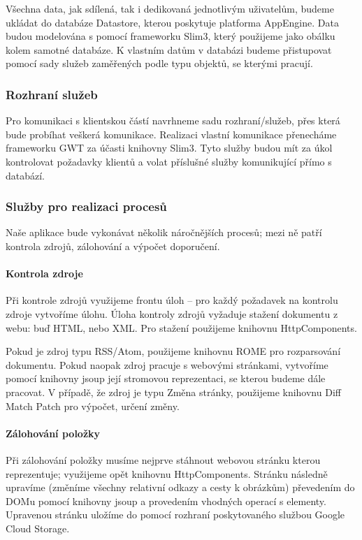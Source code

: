 Všechna data, jak sdílená, tak i dedikovaná jednotlivým uživatelům, budeme ukládat do databáze Datastore, kterou poskytuje platforma AppEngine.
Data budou modelována s pomocí frameworku Slim3, který použijeme jako obálku kolem samotné databáze.
K vlastním datům v databázi budeme přistupovat pomocí sady služeb zaměřených podle typu objektů, se kterými pracují.

\subsubsection{Rozhraní služeb}

Pro komunikaci s klientskou částí navrhneme sadu rozhraní/služeb, přes která bude probíhat veškerá komunikace.
Realizaci vlastní komunikace přenecháme frameworku GWT za účasti knihovny Slim3.
Tyto služby budou mít za úkol kontrolovat požadavky klientů a volat příslušné služby komunikující přímo s databází.

\subsubsection{Služby pro realizaci procesů}

Naše aplikace bude vykonávat několik náročnějších procesů; mezi ně patří kontrola zdrojů, zálohování a výpočet doporučení.

\paragraph{Kontrola zdroje}
Při kontrole zdrojů využijeme frontu úloh -- pro každý požadavek na kontrolu zdroje vytvoříme úlohu.
Úloha kontroly zdrojů vyžaduje stažení dokumentu z webu: buď HTML, nebo XML.
Pro stažení použijeme knihovnu HttpComponents.

Pokud je zdroj typu RSS/Atom, použijeme knihovnu ROME pro rozparsování dokumentu.
Pokud naopak zdroj pracuje s webovými stránkami, vytvoříme pomocí knihovny jsoup její stromovou reprezentaci, se kterou budeme dále pracovat.
V případě, že zdroj je typu Změna stránky, použijeme knihovnu Diff Match Patch pro výpočet, určení změny.

\paragraph{Zálohování položky}
Při zálohování položky musíme nejprve stáhnout webovou stránku kterou reprezentuje; využijeme opět knihovnu HttpComponents.
Strán\-ku následně upravíme (změníme všechny relativní odkazy a cesty k obrázkům) převedením do DOMu pomocí knihovny jsoup a provedením vhodných operací s elementy.
Upravenou stránku uložíme do  pomocí rozhraní poskytovaného službou Google Cloud Storage.


